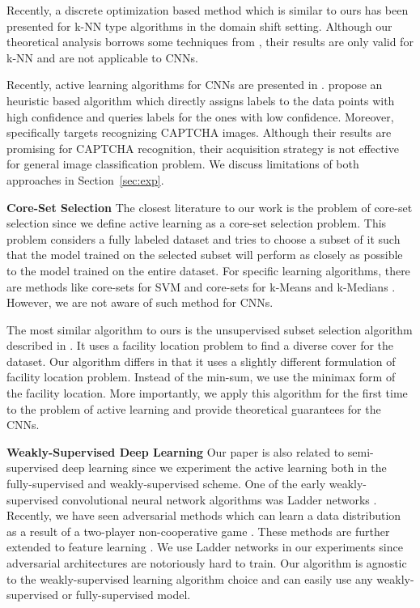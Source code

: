 \documentclass{article} %
\begin{document}
Recently, a discrete optimization based method \citep{BerlindU15} which is
similar to ours has been presented for k-NN type algorithms in the domain shift
setting. Although our theoretical analysis borrows some techniques from
\citep{BerlindU15}, their results are only valid for k-NN and are not applicable
to CNNs.

Recently, active learning algorithms for CNNs are presented in
\citep{wang2016cost, captcha}. \citet{wang2016cost} propose an heuristic based algorithm which directly assigns
labels to the data points with high confidence and queries labels for the ones
with low confidence. Moreover, \citet{captcha} specifically targets recognizing CAPTCHA images. Although their results are promising for CAPTCHA recognition, their acquisition strategy is not effective for general image classification problem. We discuss limitations of both approaches in Section~\ref{sec:exp}.

\noindent\textbf{Core-Set Selection} The closest literature to our
work is the problem of core-set selection since we define active learning as a
core-set selection problem. This problem considers a
fully labeled dataset and tries to choose a subset of it such that the model
trained on the selected subset will perform as closely as possible to the model
trained on the entire dataset. For specific learning algorithms, there are
methods like core-sets for SVM \citep{tsang2005core} and core-sets for k-Means
and k-Medians \citep{har2005smaller}. However, we are not aware of such method for CNNs.

The most similar algorithm to ours is the unsupervised subset selection
algorithm described in \citep{wei2013using}. It uses a facility location problem
to find a diverse cover for the dataset. Our algorithm differs in that it uses a
slightly different formulation of facility location problem. Instead of the
min-sum, we use the minimax \citep{facility} form of the facility location. More
importantly, we apply this algorithm for the first time to the problem of active
learning and provide theoretical guarantees for the CNNs.
 
\noindent\textbf{Weakly-Supervised Deep Learning} Our paper is also related to
semi-supervised deep learning since we experiment the active learning both in
the fully-supervised and weakly-supervised scheme. One of the early
weakly-supervised convolutional neural network algorithms was Ladder networks
\citep{ladder}. Recently, we have seen adversarial methods which can learn a data
distribution as a result of a two-player non-cooperative game
\citep{salimans2016improved,gan_original,dcgan}. These methods are further
extended to feature learning \citep{ali, bigan}. We use Ladder networks in our
experiments since adversarial architectures are notoriously hard to train. Our
algorithm is agnostic to the weakly-supervised learning algorithm choice and can
easily use any weakly-supervised or fully-supervised model.
\end{document}
